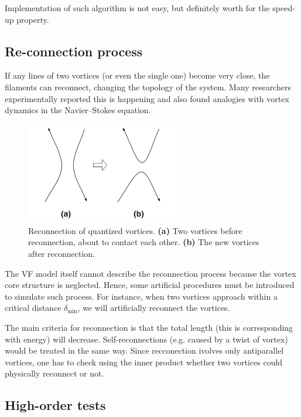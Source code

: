 Implementation of such algorithm is not easy, but definitely worth for the speed-up property.


\subsection*{Re-connection process}

If any lines of two vortices (or even the single one) become very close,
the filaments can reconnect, changing the topology of the system.
Many researchers experimentally reported this is happening and also found analogies with vortex dynamics in the Navier–Stokes equation.

\begin{figure}[h]
	\centering
	\includegraphics[width=0.6\textwidth]{graphics/simul/reconnection}
	\caption{Reconnection of quantized vortices. \textbf{(a)} Two vortices before reconnection, about to contact each other. \textbf{(b)} The new vortices after reconnection.}
\end{figure}

The VF model itself cannot describe the reconnection process because the vortex core structure is neglected. Hence, some artificial procedures must be introduced to simulate such process. For instance, when two vortices approach within a critical distance $\delta_{\text{min}}$, we will artificially reconnect the vortices.

The main criteria for reconnection is that the total length (this is corresponding with energy) will decrease. Self-reconnections (e.g. caused by a twist of vortex) would be treated in the same way. Since recconection ivolves only antiparallel vortices, one has to check using the inner product whether two vortices could physically reconnect or not.

\subsection*{High-order tests}

